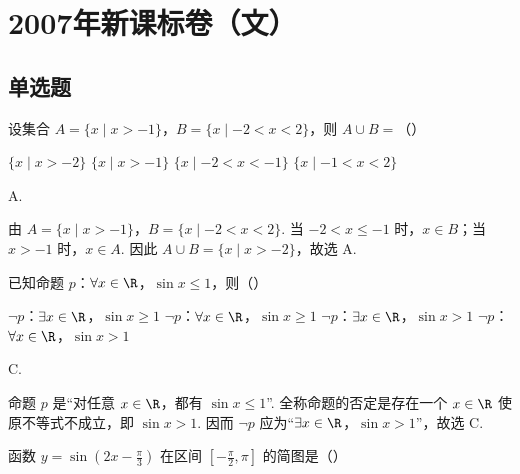 
\chapter{2007年新课标卷（文）}

\section{单选题}

\begin{problem}
设集合 \(A = \{x \mid x > -1\}\)，\(B = \{x \mid -2 < x < 2\}\)，则 \(A \cup B =\)（\quad）

\choices
    {\(\{x \mid x > -2\}\)}
    {\(\{x \mid x > -1\}\)}
    {\(\{x \mid -2 < x < -1\}\)}
    {\(\{x \mid -1 < x < 2\}\)}
\end{problem}

\begin{answer}
A.
\end{answer}

\begin{solution}
由 \(A=\{x\mid x>-1\}\)，\(B=\{x\mid -2<x<2\}\). 当 \(-2<x\leqslant -1\) 时，\(x\in B\)；当 \(x>-1\) 时，\(x\in A\). 因此 \(A\cup B=\{x\mid x>-2\}\)，故选 A.
\end{solution}

\begin{problem}
已知命题 \(p\)：\(\forall x \in \R\)，\(\sin x \leqslant 1\)，则（\quad）

\choices
    {\(\neg p\)：\(\exists x \in \R\)，\(\sin x \geqslant 1\)}
    {\(\neg p\)：\(\forall x \in \R\)，\(\sin x \geqslant 1\)}
    {\(\neg p\)：\(\exists x \in \R\)，\(\sin x > 1\)}
    {\(\neg p\)：\(\forall x \in \R\)，\(\sin x > 1\)}
\end{problem}

\begin{answer}
C.
\end{answer}

\begin{solution}
命题 \(p\) 是“对任意 \(x\in\R\)，都有 \(\sin x\leqslant1\)”. 全称命题的否定是存在一个 \(x\in\R\) 使原不等式不成立，即 \(\sin x>1\). 因而 \(\neg p\) 应为“\(\exists x\in\R\)，\(\sin x>1\)”，故选 C.
\end{solution}

\begin{problem}
函数 \( y = \sin \left(2x - \frac{\pi}{3}\right) \) 在区间 \(\left[-\frac{\pi}{2}, \pi\right]\) 的简图是（\quad）

    {}
    {}
    {}
\end{problem}

